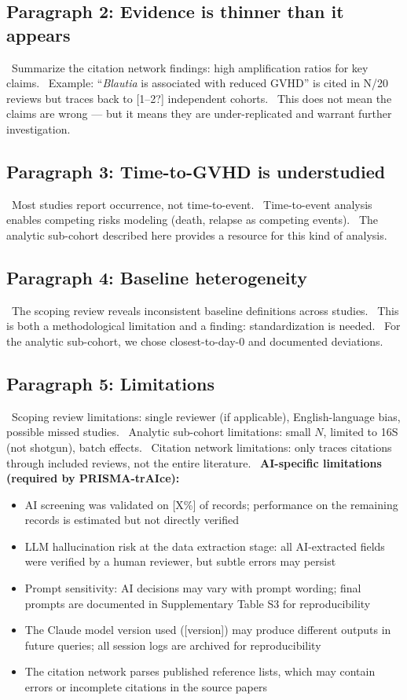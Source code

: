 \documentclass[11pt,a4paper]{article}
\newcommand{\todoitem}[1]{\textcolor{blue!70!black}{\textbullet~#1}}
\begin{document}
\subsection*{Paragraph 2: Evidence is thinner than it appears}
\todoitem{Summarize the citation network findings: high amplification ratios for key claims.}
\todoitem{Example: ``\textit{Blautia} is associated with reduced GVHD'' is cited in N/20 reviews but traces back to [1--2?] independent cohorts.}
\todoitem{This does not mean the claims are wrong --- but it means they are under-replicated and warrant further investigation.}

\subsection*{Paragraph 3: Time-to-GVHD is understudied}
\todoitem{Most studies report occurrence, not time-to-event.}
\todoitem{Time-to-event analysis enables competing risks modeling (death, relapse as competing events).}
\todoitem{The analytic sub-cohort described here provides a resource for this kind of analysis.}

\subsection*{Paragraph 4: Baseline heterogeneity}
\todoitem{The scoping review reveals inconsistent baseline definitions across studies.}
\todoitem{This is both a methodological limitation and a finding: standardization is needed.}
\todoitem{For the analytic sub-cohort, we chose closest-to-day-0 and documented deviations.}

\subsection*{Paragraph 5: Limitations}
\todoitem{Scoping review limitations: single reviewer (if applicable), English-language bias, possible missed studies.}
\todoitem{Analytic sub-cohort limitations: small $N$, limited to 16S (not shotgun), batch effects.}
\todoitem{Citation network limitations: only traces citations through included reviews, not the entire literature.}
\todoitem{\textbf{AI-specific limitations (required by PRISMA-trAIce):}}
\begin{itemize}[nosep]
    \item AI screening was validated on [X\%] of records; performance on the remaining records is estimated but not directly verified
    \item LLM hallucination risk at the data extraction stage: all AI-extracted fields were verified by a human reviewer, but subtle errors may persist
    \item Prompt sensitivity: AI decisions may vary with prompt wording; final prompts are documented in Supplementary Table S3 for reproducibility
    \item The Claude model version used ([version]) may produce different outputs in future queries; all session logs are archived for reproducibility
    \item The citation network parses published reference lists, which may contain errors or incomplete citations in the source papers
\end{itemize}
\end{document}
